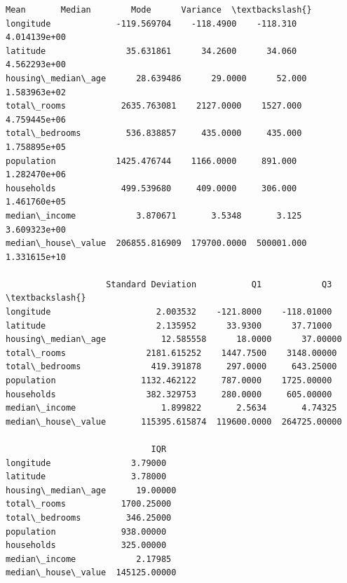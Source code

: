 \documentclass[11pt]{article}
\makeatletter
\newcommand{\boxspacing}{\kern\kvtcb@left@rule\kern\kvtcb@boxsep}
\newcommand{\prompt}[4]{
        {\ttfamily\llap{{\color{#2}[#3]:\hspace{3pt}#4}}\vspace{-\baselineskip}}
    }
\makeatother
\begin{document}
            \begin{tcolorbox}[breakable, size=fbox, boxrule=.5pt, pad at break*=1mm, opacityfill=0]
\prompt{Out}{outcolor}{54}{\boxspacing}
\begin{Verbatim}[commandchars=\\\{\}]
                             Mean       Median        Mode      Variance  \textbackslash{}
longitude             -119.569704    -118.4900    -118.310  4.014139e+00
latitude                35.631861      34.2600      34.060  4.562293e+00
housing\_median\_age      28.639486      29.0000      52.000  1.583963e+02
total\_rooms           2635.763081    2127.0000    1527.000  4.759445e+06
total\_bedrooms         536.838857     435.0000     435.000  1.758895e+05
population            1425.476744    1166.0000     891.000  1.282470e+06
households             499.539680     409.0000     306.000  1.461760e+05
median\_income            3.870671       3.5348       3.125  3.609323e+00
median\_house\_value  206855.816909  179700.0000  500001.000  1.331615e+10

                    Standard Deviation           Q1            Q3  \textbackslash{}
longitude                     2.003532    -121.8000    -118.01000
latitude                      2.135952      33.9300      37.71000
housing\_median\_age           12.585558      18.0000      37.00000
total\_rooms                2181.615252    1447.7500    3148.00000
total\_bedrooms              419.391878     297.0000     643.25000
population                 1132.462122     787.0000    1725.00000
households                  382.329753     280.0000     605.00000
median\_income                 1.899822       2.5634       4.74325
median\_house\_value       115395.615874  119600.0000  264725.00000

                             IQR
longitude                3.79000
latitude                 3.78000
housing\_median\_age      19.00000
total\_rooms           1700.25000
total\_bedrooms         346.25000
population             938.00000
households             325.00000
median\_income            2.17985
median\_house\_value  145125.00000
\end{Verbatim}
\end{tcolorbox}
        
\end{document}

